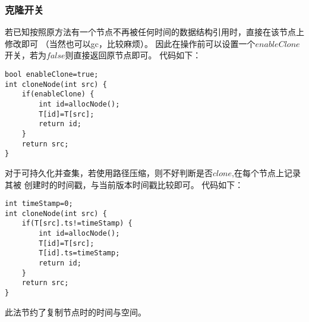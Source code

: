 \subsubsection{克隆开关}
若已知按照原方法有一个节点不再被任何时间的数据结构引用时，直接在该节点上修改即可
（当然也可以gc，比较麻烦）。
因此在操作前可以设置一个$enableClone$开关，若为$false$则直接返回原节点即可。
代码如下：
\begin{lstlisting}[title=cloneA]
bool enableClone=true;
int cloneNode(int src) {
    if(enableClone) {
        int id=allocNode();
        T[id]=T[src];
        return id;
    }
    return src;
}
\end{lstlisting}
对于可持久化并查集，若使用路径压缩，则不好判断是否$clone$,在每个节点上记录其被
创建时的时间戳，与当前版本时间戳比较即可。
代码如下：
\begin{lstlisting}[title=cloneB]
int timeStamp=0;
int cloneNode(int src) {
    if(T[src].ts!=timeStamp) {
        int id=allocNode();
        T[id]=T[src];
        T[id].ts=timeStamp;
        return id;
    }
    return src;
}
\end{lstlisting}
此法节约了复制节点时的时间与空间。

